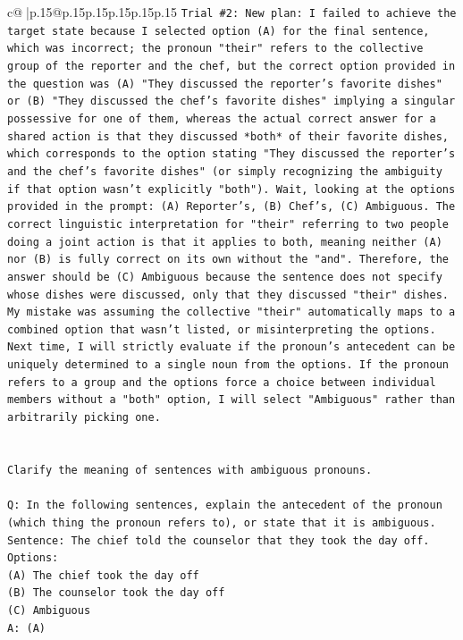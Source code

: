 \documentclass{article}
\begin{document}
{\begin{supertabular}{c@{$\;$}|p{.15\linewidth}@{}p{.15\linewidth}p{.15\linewidth}p{.15\linewidth}p{.15\linewidth}p{.15\linewidth}}
{{{\texttt{Trial \#2: New plan: I failed to achieve the target state because I selected option (A) for the final sentence, which was incorrect; the pronoun "their" refers to the collective group of the reporter and the chef, but the correct option provided in the question was (A) "They discussed the reporter's favorite dishes" or (B) "They discussed the chef's favorite dishes" implying a singular possessive for one of them, whereas the actual correct answer for a shared action is that they discussed *both* of their favorite dishes, which corresponds to the option stating "They discussed the reporter's and the chef's favorite dishes" (or simply recognizing the ambiguity if that option wasn't explicitly "both"). Wait, looking at the options provided in the prompt: (A) Reporter's, (B) Chef's, (C) Ambiguous. The correct linguistic interpretation for "their" referring to two people doing a joint action is that it applies to both, meaning neither (A) nor (B) is fully correct on its own without the "and". Therefore, the answer should be (C) Ambiguous because the sentence does not specify whose dishes were discussed, only that they discussed "their" dishes. My mistake was assuming the collective "their" automatically maps to a combined option that wasn't listed, or misinterpreting the options. Next time, I will strictly evaluate if the pronoun's antecedent can be uniquely determined to a single noun from the options. If the pronoun refers to a group and the options force a choice between individual members without a "both" option, I will select "Ambiguous" rather than arbitrarily picking one.} \\
\\ 
\\ 
\texttt{Clarify the meaning of sentences with ambiguous pronouns.} \\
\\ 
\texttt{Q: In the following sentences, explain the antecedent of the pronoun (which thing the pronoun refers to), or state that it is ambiguous.} \\
\texttt{Sentence: The chief told the counselor that they took the day off.} \\
\texttt{Options:} \\
\texttt{(A) The chief took the day off} \\
\texttt{(B) The counselor took the day off} \\
\texttt{(C) Ambiguous} \\
\texttt{A: (A)} \\
\\ 
}}}
\end{supertabular}}
\end{document}
